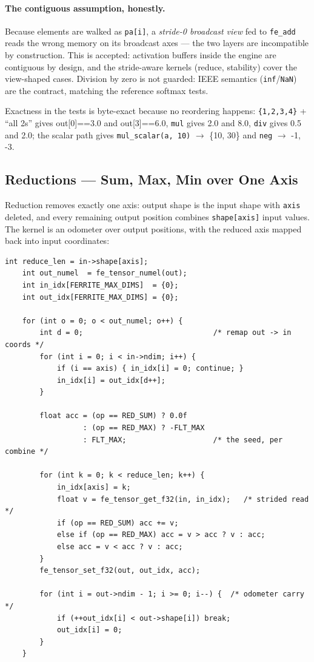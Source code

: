 \documentclass[11pt,a4paper]{article}
\begin{document}
\paragraph{The contiguous assumption, honestly.} Because elements are walked as
\texttt{pa[i]}, a \emph{stride-0 broadcast view} fed to \texttt{fe\_add} reads
the wrong memory on its broadcast axes --- the two layers are incompatible by
construction. This is accepted: activation buffers inside the engine are
contiguous by design, and the stride-aware kernels (reduce, stability) cover
the view-shaped cases. Division by zero is not guarded: IEEE semantics
(\texttt{inf}/\texttt{NaN}) are the contract, matching the reference softmax
tests.

Exactness in the tests is byte-exact because no reordering happens:
\texttt{\{1,2,3,4\}} + ``all 2s'' gives out[0]==3.0 and out[3]==6.0,
\texttt{mul} gives 2.0 and 8.0, \texttt{div} gives 0.5 and 2.0; the scalar
path gives \texttt{mul\_scalar(a, 10)} $\to$ \{10, 30\} and \texttt{neg} $\to$
{-1, -3}.

\subsection{Reductions --- Sum, Max, Min over One Axis}

Reduction removes exactly one axis: output shape is the input shape with
\texttt{axis} deleted, and every remaining output position combines
\texttt{shape[axis]} input values. The kernel is an odometer over output
positions, with the reduced axis mapped back into input coordinates:

\begin{lstlisting}[style=cstyle,caption={ops/reduce.c --- axis-removal machinery}]
    int reduce_len = in->shape[axis];
    int out_numel  = fe_tensor_numel(out);
    int in_idx[FERRITE_MAX_DIMS]  = {0};
    int out_idx[FERRITE_MAX_DIMS] = {0};

    for (int o = 0; o < out_numel; o++) {
        int d = 0;                              /* remap out -> in coords */
        for (int i = 0; i < in->ndim; i++) {
            if (i == axis) { in_idx[i] = 0; continue; }
            in_idx[i] = out_idx[d++];
        }

        float acc = (op == RED_SUM) ? 0.0f
                  : (op == RED_MAX) ? -FLT_MAX
                  : FLT_MAX;                    /* the seed, per combine */

        for (int k = 0; k < reduce_len; k++) {
            in_idx[axis] = k;
            float v = fe_tensor_get_f32(in, in_idx);   /* strided read */
            if (op == RED_SUM) acc += v;
            else if (op == RED_MAX) acc = v > acc ? v : acc;
            else acc = v < acc ? v : acc;
        }
        fe_tensor_set_f32(out, out_idx, acc);

        for (int i = out->ndim - 1; i >= 0; i--) {  /* odometer carry */
            if (++out_idx[i] < out->shape[i]) break;
            out_idx[i] = 0;
        }
    }
\end{lstlisting}
\end{document}
